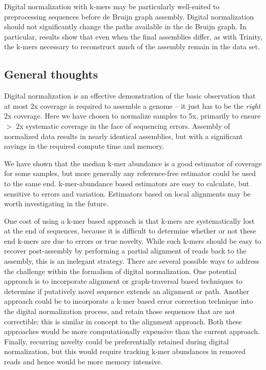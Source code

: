\documentclass[10pt,draft]{article}
\begin{document}
Digital normalization with k-mers may be particularly well-suited to
preprocessing sequences before de Bruijn graph assembly.  Digital
normalization should not significantly change the paths available in
the de Bruijn graph.  In particular, results show that even when the
final assemblies differ, as with Trinity, the k-mers necessary to
reconstruct much of the assembly remain in the data set.

\subsection*{General thoughts}

Digital normalization is an effective demonstration of the basic
observation that at most 2x coverage is required to assemble a genome
-- it just has to be the {\em right} 2x coverage.  Here we have chosen
to normalize samples to 5x, primarily to ensure $>$ 2x systematic
coverage in the face of sequencing errors.  Assembly of normalized
data results in nearly identical assemblies, but with a significant
savings in the required compute time and memory.

We have shown that the median k-mer abundance is a good estimator of
coverage for some samples, but more generally any reference-free
estimator could be used to the same end.  k-mer-abundance based
estimators are easy to calculate, but sensitive to errors and
variation.  Estimators based on local alignments may be worth
investigating in the future.

One cost of using a k-mer based approach is that k-mers are
systematically lost at the end of sequences, because it is difficult
to determine whether or not these end k-mers are due to errors or true
novelty.  While such k-mers should be easy to recover post-assembly by
performing a partial alignment of reads back to the assembly, this is
an inelegant strategy.  There are several possible ways to address the
challenge within the formalism of digital normalization.  One potential
approach is to incorporate alignment or graph-traversal based
techniques to determine if putatively novel sequence extends an
alignment or path.  Another approach could be to incorporate a k-mer
based error correction technique into the digital normalization
process, and retain those sequences that are not correctible; this is
similar in concept to the alignment approach.  Both these approaches
would be more computationally expensive than the current approach.
Finally, recurring novelty could be preferentially retained during
digital normalization, but this would require tracking k-mer
abundances in removed reads and hence would be more memory intensive.
\end{document}
